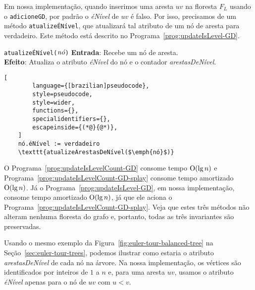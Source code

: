 Em nossa implementação, quando inserimos uma aresta $uv$ na floresta $F_L$ usando o \texttt{adicioneGD}, por padrão o \textit{éNível} de $uv$ é falso. Por isso, precisamos de um método \texttt{atualizeÉNível}, que atualizará tal atributo de um nó de aresta para verdadeiro. Este método está descrito no Programa~\ref{prog:updateIsLevel-GD}.

\begin{programruledcaption}{\texttt{atualizeÉNível($\emph{nó}$)} \label{prog:updateIsLevel-GD}}
    \noindent\textbf{Entrada}: Recebe um nó de aresta.\\
    \noindent\textbf{Efeito}: Atualiza o atributo \textit{éNível} do nó e o contador \textit{arestasDeNível}.
    \vspace{-0.5\baselineskip}
    \begin{lstlisting}[
        language={[brazilian]pseudocode},
        style=pseudocode,
        style=wider,
        functions={},
        specialidentifiers={},
        escapeinside={(*@}{@*)},
    ]
    nó.éNível := verdadeiro
    \texttt{atualizeArestasDeNível($\emph{nó}$)}
\end{lstlisting}
\vspace{-0.5\baselineskip}
\end{programruledcaption}

O Programa~\ref{prog:updateIsLevelCount-GD} consome tempo $\mathrm{O}(\lg n)$ e Programa~\ref{prog:updateIsLevelCount-GD-splay} consome tempo amortizado $\mathrm{O}(\lg n)$. Já o Programa~\ref{prog:updateIsLevel-GD}, em nossa implementação, consome tempo amortizado $\mathrm{O}(\lg n)$, já que ele aciona o Programa~\ref{prog:updateIsLevelCount-GD-splay}. Veja que estes três métodos não alteram nenhuma floresta do grafo e, portanto, todas as três invariantes são preservadas.

Usando o mesmo exemplo da Figura~\ref{fig:euler-tour-balanced-tree} na Seção~\ref{sec:euler-tour-trees}, podemos ilustrar como estaria o atributo \textit{arestasDeNível} de cada nó na árvore. Na nossa implementação, os vértices são identificados por inteiros de $1$ a $n$ e, para uma aresta $uv$, usamos o atributo \textit{éNível} apenas para o nó de $uv$ com $u < v$.

